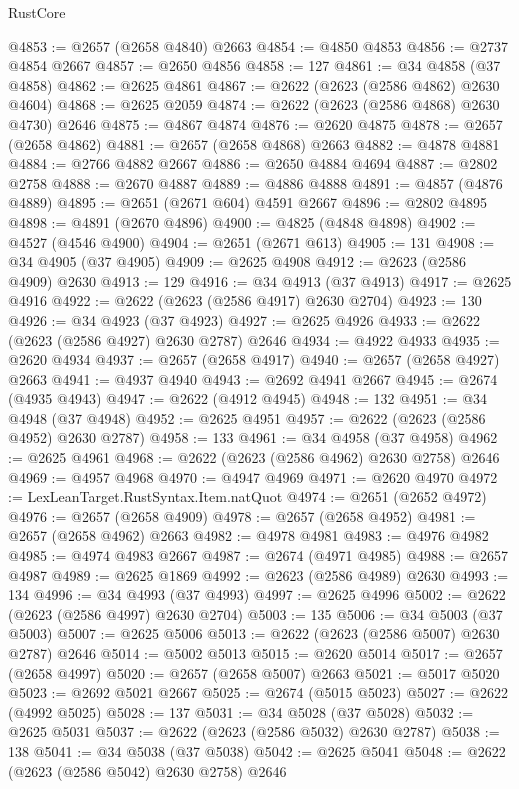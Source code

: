 \begin{lexlean}{RustCore}
\begin{coremodule}
@4853 := @2657 (@2658 @4840) @2663
@4854 := @4850 @4853
@4856 := @2737 @4854 @2667
@4857 := @2650 @4856
@4858 := 127
@4861 := @34 @4858 (@37 @4858)
@4862 := @2625 @4861
@4867 := @2622 (@2623 (@2586 @4862) @2630 @4604)
@4868 := @2625 @2059
@4874 := @2622 (@2623 (@2586 @4868) @2630 @4730) @2646
@4875 := @4867 @4874
@4876 := @2620 @4875
@4878 := @2657 (@2658 @4862)
@4881 := @2657 (@2658 @4868) @2663
@4882 := @4878 @4881
@4884 := @2766 @4882 @2667
@4886 := @2650 @4884 @4694
@4887 := @2802 @2758
@4888 := @2670 @4887
@4889 := @4886 @4888
@4891 := @4857 (@4876 @4889)
@4895 := @2651 (@2671 @604) @4591 @2667
@4896 := @2802 @4895
@4898 := @4891 (@2670 @4896)
@4900 := @4825 (@4848 @4898)
@4902 := @4527 (@4546 @4900)
@4904 := @2651 (@2671 @613)
@4905 := 131
@4908 := @34 @4905 (@37 @4905)
@4909 := @2625 @4908
@4912 := @2623 (@2586 @4909) @2630
@4913 := 129
@4916 := @34 @4913 (@37 @4913)
@4917 := @2625 @4916
@4922 := @2622 (@2623 (@2586 @4917) @2630 @2704)
@4923 := 130
@4926 := @34 @4923 (@37 @4923)
@4927 := @2625 @4926
@4933 := @2622 (@2623 (@2586 @4927) @2630 @2787) @2646
@4934 := @4922 @4933
@4935 := @2620 @4934
@4937 := @2657 (@2658 @4917)
@4940 := @2657 (@2658 @4927) @2663
@4941 := @4937 @4940
@4943 := @2692 @4941 @2667
@4945 := @2674 (@4935 @4943)
@4947 := @2622 (@4912 @4945)
@4948 := 132
@4951 := @34 @4948 (@37 @4948)
@4952 := @2625 @4951
@4957 := @2622 (@2623 (@2586 @4952) @2630 @2787)
@4958 := 133
@4961 := @34 @4958 (@37 @4958)
@4962 := @2625 @4961
@4968 := @2622 (@2623 (@2586 @4962) @2630 @2758) @2646
@4969 := @4957 @4968
@4970 := @4947 @4969
@4971 := @2620 @4970
@4972 := LexLeanTarget.RustSyntax.Item.natQuot
@4974 := @2651 (@2652 @4972)
@4976 := @2657 (@2658 @4909)
@4978 := @2657 (@2658 @4952)
@4981 := @2657 (@2658 @4962) @2663
@4982 := @4978 @4981
@4983 := @4976 @4982
@4985 := @4974 @4983 @2667
@4987 := @2674 (@4971 @4985)
@4988 := @2657 @4987
@4989 := @2625 @1869
@4992 := @2623 (@2586 @4989) @2630
@4993 := 134
@4996 := @34 @4993 (@37 @4993)
@4997 := @2625 @4996
@5002 := @2622 (@2623 (@2586 @4997) @2630 @2704)
@5003 := 135
@5006 := @34 @5003 (@37 @5003)
@5007 := @2625 @5006
@5013 := @2622 (@2623 (@2586 @5007) @2630 @2787) @2646
@5014 := @5002 @5013
@5015 := @2620 @5014
@5017 := @2657 (@2658 @4997)
@5020 := @2657 (@2658 @5007) @2663
@5021 := @5017 @5020
@5023 := @2692 @5021 @2667
@5025 := @2674 (@5015 @5023)
@5027 := @2622 (@4992 @5025)
@5028 := 137
@5031 := @34 @5028 (@37 @5028)
@5032 := @2625 @5031
@5037 := @2622 (@2623 (@2586 @5032) @2630 @2787)
@5038 := 138
@5041 := @34 @5038 (@37 @5038)
@5042 := @2625 @5041
@5048 := @2622 (@2623 (@2586 @5042) @2630 @2758) @2646

\end{coremodule}
\end{lexlean}
